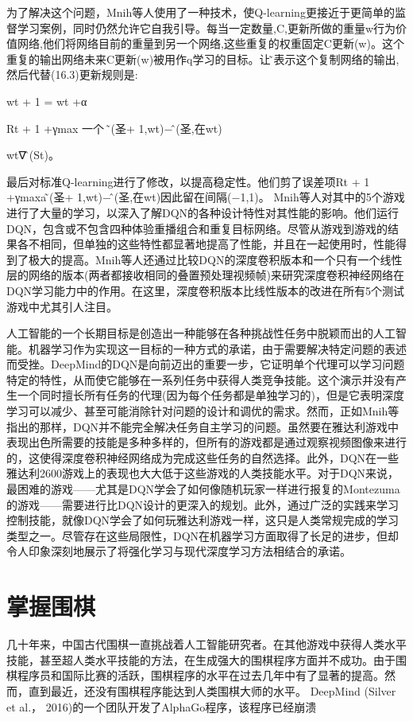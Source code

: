 为了解决这个问题，Mnih等人使用了一种技术，使Q-learning更接近于更简单的监督学习案例，同时仍然允许它自我引导。每当一定数量,C,更新所做的重量w行为价值网络,他们将网络目前的重量到另一个网络,这些重复的权重固定C更新(w)。这个重复的输出网络未来C更新(w)被用作q学习的目标。让问̃表示这个复制网络的输出,然后代替(16.3)更新规则是:

wt + 1 = wt +α

Rt + 1 +γmax
一个
问̃(圣+ 1,wt)−问̂(圣,在wt)

wt∇问̂(St)。

最后对标准Q-learning进行了修改，以提高稳定性。他们剪了误差项Rt + 1 +γmaxa问̃(圣+ 1,wt)−问̂(圣,在wt)因此留在间隔(−1,1)。
Mnih等人对其中的5个游戏进行了大量的学习，以深入了解DQN的各种设计特性对其性能的影响。他们运行DQN，包含或不包含四种体验重播组合和重复目标网络。尽管从游戏到游戏的结果各不相同，但单独的这些特性都显著地提高了性能，并且在一起使用时，性能得到了极大的提高。Mnih等人还通过比较DQN的深度卷积版本和一个只有一个线性层的网络的版本(两者都接收相同的叠置预处理视频帧)来研究深度卷积神经网络在DQN学习能力中的作用。在这里，深度卷积版本比线性版本的改进在所有5个测试游戏中尤其引人注目。

人工智能的一个长期目标是创造出一种能够在各种挑战性任务中脱颖而出的人工智能。机器学习作为实现这一目标的一种方式的承诺，由于需要解决特定问题的表述而受挫。DeepMind的DQN是向前迈出的重要一步，它证明单个代理可以学习问题特定的特性，从而使它能够在一系列任务中获得人类竞争技能。这个演示并没有产生一个同时擅长所有任务的代理(因为每个任务都是单独学习的)，但是它表明深度学习可以减少、甚至可能消除针对问题的设计和调优的需求。然而，正如Mnih等指出的那样，DQN并不能完全解决任务自主学习的问题。虽然要在雅达利游戏中表现出色所需要的技能是多种多样的，但所有的游戏都是通过观察视频图像来进行的，这使得深度卷积神经网络成为完成这些任务的自然选择。此外，DQN在一些雅达利2600游戏上的表现也大大低于这些游戏的人类技能水平。对于DQN来说，最困难的游戏——尤其是DQN学会了如何像随机玩家一样进行报复的Montezuma的游戏——需要进行比DQN设计的更深入的规划。此外，通过广泛的实践来学习控制技能，就像DQN学会了如何玩雅达利游戏一样，这只是人类常规完成的学习类型之一。尽管存在这些局限性，DQN在机器学习方面取得了长足的进步，但却令人印象深刻地展示了将强化学习与现代深度学习方法相结合的承诺。


\section{掌握围棋}

几十年来，中国古代围棋一直挑战着人工智能研究者。在其他游戏中获得人类水平技能，甚至超人类水平技能的方法，在生成强大的围棋程序方面并不成功。由于围棋程序员和国际比赛的活跃，围棋程序的水平在过去几年中有了显著的提高。然而，直到最近，还没有围棋程序能达到人类围棋大师的水平。
DeepMind (Silver et al.， 2016)的一个团队开发了AlphaGo程序，该程序已经崩溃

